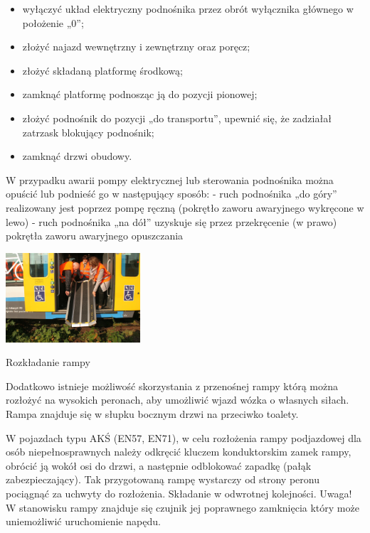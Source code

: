\begin{itemize}
	\item wyłączyć układ elektryczny podnośnika przez obrót wyłącznika głównego w położenie „0”;
	\item złożyć najazd wewnętrzny i zewnętrzny oraz poręcz;
	\item złożyć składaną platformę środkową;
	\item zamknąć platformę podnosząc ją do pozycji pionowej;
	\item złożyć podnośnik do pozycji „do transportu”, upewnić się, że zadziałał zatrzask blokujący podnośnik;
	\item zamknąć drzwi obudowy.
\end{itemize}
W przypadku awarii pompy elektrycznej lub sterowania podnośnika można opuścić lub podnieść go w następujący sposób:
- ruch podnośnika „do góry” realizowany jest poprzez pompę ręczną (pokrętło zaworu awaryjnego wykręcone w lewo)
- ruch podnośnika „na dół” uzyskuje się przez przekręcenie (w prawo) pokrętła zaworu awaryjnego opuszczania

\begin{marginfigure}
	\includegraphics[width=5cm]{skryptkierownik-img/skryptkierownik-img054.jpg}
	\caption{Rozkładanie rampy}
\end{marginfigure}
Dodatkowo istnieje możliwość skorzystania z przenośnej rampy którą można rozłożyć na wysokich peronach, aby umożliwić wjazd wózka o własnych siłach. Rampa znajduje się w słupku bocznym drzwi na przeciwko toalety. 

W pojazdach typu AKŚ (EN57, EN71), w celu rozłożenia rampy podjazdowej dla osób niepełnosprawnych należy odkręcić kluczem konduktorskim zamek rampy, obrócić ją wokół osi do drzwi, a następnie odblokować zapadkę (pałąk zabezpieczający). Tak przygotowaną rampę wystarczy od strony peronu pociągnąć za uchwyty do rozłożenia. Składanie w odwrotnej kolejności. Uwaga! W stanowisku rampy znajduje się czujnik jej poprawnego zamknięcia który może uniemożliwić uruchomienie napędu.

